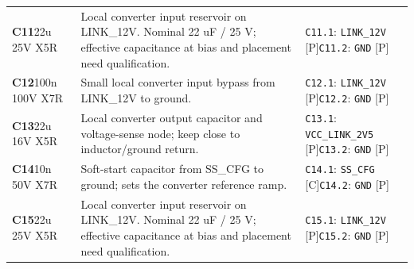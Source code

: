 \documentclass[11pt,a4paper]{article}
\begin{document}
\begin{longtable}{@{}P{27mm}P{83mm}P{58mm}@{}}
\textbf{C11}\newline 22u 25V X5R & Local converter input reservoir on LINK\_12V. Nominal 22 uF / 25 V; effective capacitance at bias and placement need qualification. & \nolinkurl{C11.1}: \nolinkurl{LINK_12V} [P]\newline \nolinkurl{C11.2}: \nolinkurl{GND} [P] \\
\textbf{C12}\newline 100n 100V X7R & Small local converter input bypass from LINK\_12V to ground. & \nolinkurl{C12.1}: \nolinkurl{LINK_12V} [P]\newline \nolinkurl{C12.2}: \nolinkurl{GND} [P] \\
\textbf{C13}\newline 22u 16V X5R & Local converter output capacitor and voltage-sense node; keep close to inductor/ground return. & \nolinkurl{C13.1}: \nolinkurl{VCC_LINK_2V5} [P]\newline \nolinkurl{C13.2}: \nolinkurl{GND} [P] \\
\textbf{C14}\newline 10n 50V X7R & Soft-start capacitor from SS\_CFG to ground; sets the converter reference ramp. & \nolinkurl{C14.1}: \nolinkurl{SS_CFG} [C]\newline \nolinkurl{C14.2}: \nolinkurl{GND} [P] \\
\textbf{C15}\newline 22u 25V X5R & Local converter input reservoir on LINK\_12V. Nominal 22 uF / 25 V; effective capacitance at bias and placement need qualification. & \nolinkurl{C15.1}: \nolinkurl{LINK_12V} [P]\newline \nolinkurl{C15.2}: \nolinkurl{GND} [P] \\

\end{longtable}
\end{document}
